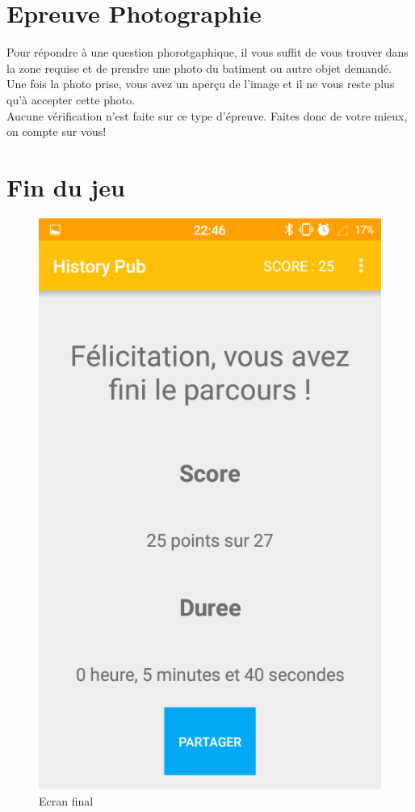 \documentclass[11pt]{scrreprt}
\begin{document}
    \section{Epreuve Photographie}

    Pour répondre à une question phorotgaphique, il vous suffit de vous trouver dans la zone requise et de prendre une photo du batiment ou autre objet demandé. Une fois la photo prise, vous avez un aperçu de l'image et il ne vous reste plus qu'à accepter cette photo.\\

    Aucune vérification n'est faite sur ce type d'épreuve. Faites donc de votre mieux, on compte sur vous!

    \section{Fin du jeu}
    \begin{figure}[H]
        \centering
        \includegraphics[scale=.25]{images/final.png}
        \caption{Ecran final}
    \end{figure}
\end{document}
